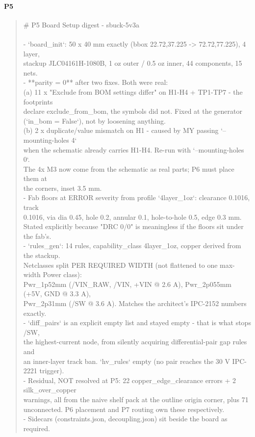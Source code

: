 \documentclass[11pt,a4paper]{article}
\begin{document}
\paragraph*{P5}
\begin{quote}\small\ttfamily\raggedright
\# P5 Board Setup digest - sbuck-5v3a\\
~\\
- `board\_init`: 50 x 40 mm exactly (bbox 22.72,37.225 -\textgreater{} 72.72,77.225), 4 layer,\\
  stackup JLC04161H-1080B, 1 oz outer / 0.5 oz inner, 44 components, 15 nets.\\
- {*}{*}parity = 0{*}{*} after two fixes. Both were real:\\
  (a) 11 x "Exclude from BOM settings differ" on H1-H4 + TP1-TP7 - the footprints\\
      declare exclude\_from\_bom, the symbols did not. Fixed at the generator\\
      (`in\_bom = False`), not by loosening anything.\\
  (b) 2 x duplicate/value mismatch on H1 - caused by MY passing `--mounting-holes 4`\\
      when the schematic already carries H1-H4. Re-run with `--mounting-holes 0`.\\
      The 4x M3 now come from the schematic as real parts; P6 must place them at\\
      the corners, inset 3.5 mm.\\
- Fab floors at ERROR severity from profile `4layer\_1oz`: clearance 0.1016, track\\
  0.1016, via dia 0.45, hole 0.2, annular 0.1, hole-to-hole 0.5, edge 0.3 mm.\\
  Stated explicitly because "DRC 0/0" is meaningless if the floors sit under the fab's.\\
- `rules\_gen`: 14 rules, capability\_class 4layer\_1oz, copper derived from the stackup.\\
  Netclasses split PER REQUIRED WIDTH (not flattened to one max-width Power class):\\
  Pwr\_1p52mm (/VIN\_RAW, /VIN, +VIN @ 2.6 A), Pwr\_2p055mm (+5V, GND @ 3.3 A),\\
  Pwr\_2p31mm (/SW @ 3.6 A). Matches the architect's IPC-2152 numbers exactly.\\
- `diff\_pairs` is an explicit empty list and stayed empty - that is what stops /SW,\\
  the highest-current node, from silently acquiring differential-pair gap rules and\\
  an inner-layer track ban. `hv\_rules` empty (no pair reaches the 30 V IPC-2221 trigger).\\
- Residual, NOT resolved at P5: 22 copper\_edge\_clearance errors + 2 silk\_over\_copper\\
  warnings, all from the naive shelf pack at the outline origin corner, plus 71\\
  unconnected. P6 placement and P7 routing own these respectively.\\
- Sidecars (constraints.json, decoupling.json) sit beside the board as required.
\end{quote}
\end{document}
